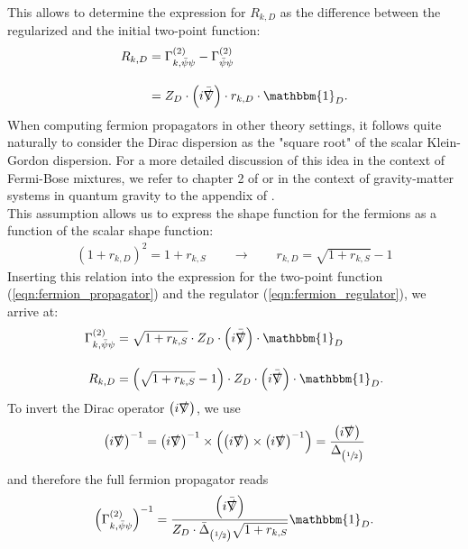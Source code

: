 This allows to determine the expression for $R_{k, D}$ as the difference between the regularized and the initial two-point function:
\begin{equation}
\begin{aligned}
	R_{k,D} &= \Gamma^{(2)}_{k, \bar{\psi}\psi} - \Gamma^{(2)}_{\bar{\psi}\psi} \\[10pt]
	&= Z_D\cdot\left(i\bar{\slashed{\nabla}}\right)\cdot r_{k,D} \cdot\mathbbm{1}_D. \label{eqn:fermion_regulator}
\end{aligned}
\end{equation}
When computing fermion propagators in other theory settings, it follows quite naturally to consider the Dirac dispersion as the "square root" of the scalar Klein-Gordon dispersion. For a more detailed discussion of this idea in the context of Fermi-Bose mixtures, we refer to chapter 2 of \cite{PawlowskiNPgaugeLecture} or in the context of gravity-matter systems in quantum gravity to the appendix of \cite{BritoHamadaPereiraYamada2019}. \\
This assumption allows us to express the shape function for the fermions as a function of the scalar shape function:
\begin{align}
\left(1+r_{k,D}\right)^2 = 1+r_{k,S} \qquad \longrightarrow \qquad r_{k, D} = \sqrt{1+r_{k,S}} - 1
\end{align}
Inserting this relation into the expression for the two-point function (\ref{eqn:fermion_propagator}) and the regulator (\ref{eqn:fermion_regulator}), we arrive at:
\begin{equation}
\begin{aligned}
	\Gamma^{(2)}_{k, \bar{\psi}\psi} &=\sqrt{1+r_{k,S}}\cdot Z_D\cdot\left(i\bar{\slashed{\nabla}}\right)\cdot\mathbbm{1}_D \\[10pt] 
	R_{k,D} &= \left(\sqrt{1+r_{k,S}} -1 \right)\cdot Z_D\cdot\left(i\bar{\slashed{\nabla}}\right)\cdot\mathbbm{1}_D.
\end{aligned}
\end{equation}
To invert the Dirac operator $\left(i\slashed{\nabla}\right)$, we use
\begin{equation}
	\left(i\slashed{\nabla}\right)^{-1} =\left(i\slashed{\nabla}\right)^{-1}\times\left(\left(i\slashed{\nabla}\right)\times\left(i\slashed{\nabla}\right)^{-1}\right) = \frac{\left(i\slashed{\nabla}\right)}{\Delta_{\left(\sfrac{1}{2}\right)}}
\end{equation}
and therefore the full fermion propagator reads
\begin{equation}
	\left(\Gamma^{(2)}_{k, \bar{\psi}\psi} \right)^{-1} = \frac{\left(i\bar{\slashed{\nabla}}\right)}{Z_D\cdot\bar{\Delta}_{\left(\sfrac{1}{2}\right)}\sqrt{1+r_{k,S}}}\mathbbm{1}_D.
\end{equation}
